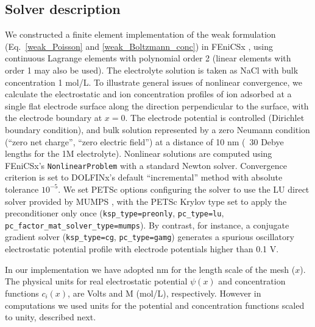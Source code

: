 \subsection{Solver description}
We constructed a finite element implementation of the weak
formulation (Eq.~\eqref{weak_Poisson} and \eqref{weak_Boltzmann_conc}) in
FEniCSx \citep{baratta2023dolfinx}, using continuous
Lagrange elements with polynomial order 2 (linear elements with order
1 may also be used).  The electrolyte solution
is taken as NaCl with bulk concentration 1 mol/L.  To illustrate
general issues of nonlinear convergence, we calculate the
electrostatic and ion concentration profiles of ion adsorbed at a
single flat electrode surface along the direction perpendicular to the
surface, with the electrode boundary at $x=0$.  The electrode
potential is controlled (Dirichlet boundary condition), and bulk
solution represented by a zero Neumann condition (``zero net charge'', ``zero electric
field'') at  a distance of 10 nm (~30 Debye lengths for the 1M
electrolyte). Nonlinear solutions are computed using FEniCSx's
\texttt{NonlinearProblem} with a standard Newton solver. Convergence criterion
is set to DOLFINx's default ``incremental'' method with absolute
tolerance $10^{-5}$.
We set PETSc options \citep{PETSc_manual,petsc4py_2011} configuring the solver to use the LU direct
solver provided by MUMPS \citep{MUMPS_2001,MUMPS_2019}, with the PETSc Krylov type set to apply the
preconditioner only once (\verb|ksp_type=preonly|, \verb|pc_type=lu|,  \verb|pc_factor_mat_solver_type=mumps|).
By contrast, for instance, a
conjugate gradient solver (\verb|ksp_type=cg|, \verb|pc_type=gamg|)
generates a spurious oscillatory electrostatic potential profile with electrode
potentials higher than 0.1 V.

In our implementation we have adopted nm for the length scale of the
mesh ($x$). The physical units for real  electrostatic potential
$\psi(x)$ and concentration functions  $c_{i}(x)$, are Volts and M
(mol/L), respectively. However in computations we used units for the
potential and concentration functions scaled to unity, described next.


